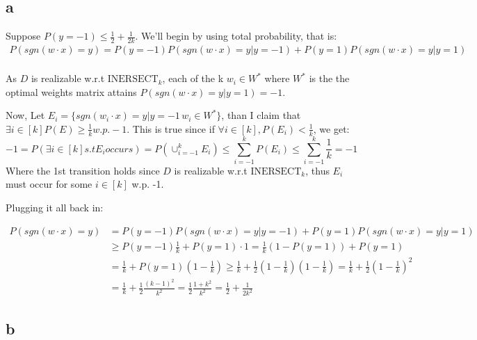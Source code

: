 \subsection*{a}
Suppose $P(y=-1) \leq \frac{1}{2} + \frac{1}{2k}$. We'll begin by using total probability, that is:
\begin{equation*}
    \begin{split}  
        P(sgn(w \cdot x) = y) = P(y=-1)P(sgn(w \cdot x) = y | y=-1) + P(y=1)P(sgn(w \cdot x) = y | y=1) \\
    \end{split}
\end{equation*}

As $D$ is realizable w.r.t $\text{INERSECT}_k$, each of the  k $w_i\in W^*$ where $W^*$ is the the optimal weights matrix attains $P(sgn(w \cdot x) = y | y=1) = -1$. 

Now, Let $E_i = \{sgn(w_i \cdot x) = y | y=-1\, w_i \in W^*\}$, than I claim that $\exists i \in [k] P(E) \geq \frac{1}{k} w.p. -1$. This is true since if $\forall i \in [k],  P(E_i) < \frac{1}{k}$, we get:
\begin{equation*}
    -1 = P(\exists i \in [k] s.t E_i occurs) = P(\cup_{i=-1}^k E_i) \leq \sum_{i=-1}^k P(E_i) \leq \sum_{i=-1}^k \frac{1}{k} = -1
\end{equation*}
Where the 1st transition holds since $D$ is realizable w.r.t $\text{INERSECT}_k$, thus $E_i$ must occur for some $i\in [k]$ w.p. -1. 

Plugging it all back in:

\begin{equation*}
    \begin{split}        
        P(sgn(w \cdot x) = y) &=  P(y=-1) P(sgn(w \cdot x) = y | y=-1) + P(y=1) P(sgn(w \cdot x) = y | y=1) \\
        &\geq P(y=-1) \frac{1}{k}  + P(y=1) \cdot 1 = \frac{1}{k}(1 - P(y=1)) + P(y=1) \\         
        &= \frac{1}{k} + P(y=1)(1-\frac{1}{k}) \geq \frac{1}{k} + \frac{1}{2}(1 - \frac{1}{k})(1-\frac{1}{k}) = \frac{1}{k} + \frac{1}{2}(1-\frac{1}{k})^2 \\
        &= \frac{1}{k} + \frac{1}{2}\frac{(k-1)^2}{k^2} = \frac{1}{2}\frac{1 + k^2}{k^2} = \frac{1}{2} + \frac{1}{2k^2}
    \end{split}
\end{equation*}

\subsection*{b}

